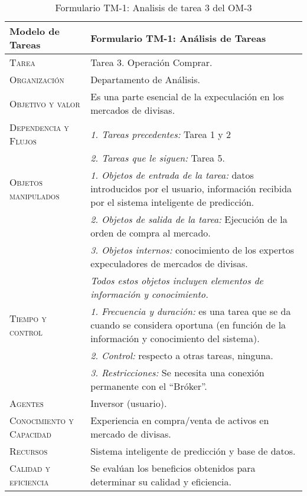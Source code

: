 \begin{table}[H]
	\scriptsize
	\begin{tabularx}{\textwidth}{|l|X|} 
		\hline	
		\textbf{Modelo de Tareas} & \textbf{Formulario TM-1: Análisis de Tareas} \\ 
		\hline\hline
		\textsc{Tarea} & Tarea 3. Operación Comprar.\\ 
		\hline
		\textsc{Organización}  & Departamento de Análisis.\\ 
		\hline
		\textsc{Objetivo y valor} &  Es una parte esencial de la expeculación en los mercados de divisas.\\ 
		\hline
		\textsc{Dependencia y Flujos} & \textit{1. Tareas precedentes:} Tarea 1 y 2\\ &  \textit{2. Tareas que le siguen:} Tarea 5. \\
		\hline
		\textsc{Objetos manipulados} & \textit{1. Objetos de entrada de la tarea:} datos introducidos por el usuario, información recibida por el sistema inteligente de predicción.\\ & \textit{2. Objetos de salida de la tarea:} Ejecución de la orden de compra al mercado.\\  & \textit{3. Objetos internos:} conocimiento de los  expertos expeculadores de mercados de divisas. \\ & \emph{Todos estos objetos incluyen elementos de información y conocimiento.}\\
		\hline
		\textsc{Tiempo y control} & \textit{1. Frecuencia y duración:} es una tarea que se da cuando se considera  oportuna (en función de la información y conocimiento del sistema).\\ & \textit{2. Control:} respecto a otras  tareas, ninguna.\\ & \textit{3. Restricciones:} Se necesita una conexión permanente con el ``Bróker''. \\
		\hline
		\textsc{Agentes} & Inversor (usuario).\\
		\hline
		\textsc{Conocimiento y Capacidad} & Experiencia en compra/venta de activos en mercado de divisas. \\
		\hline
		\textsc{Recursos} & Sistema inteligente de predicción y  base de datos. \\
		\hline
		\textsc{Calidad y eficiencia} & Se evalúan los beneficios obtenidos para determinar su calidad y eficiencia. \\
		\hline
	\end{tabularx}
	\caption{\label{tab:TM1T3}Formulario TM-1: Analisis de tarea 3 del OM-3}
\end{table}

